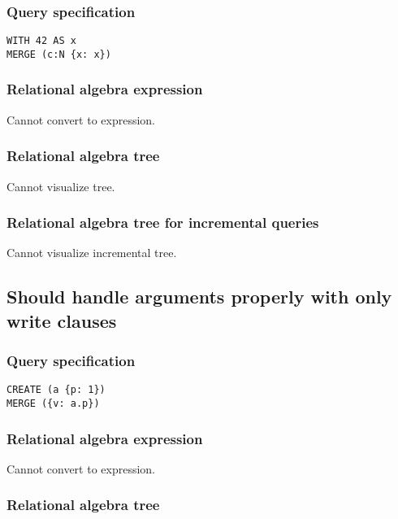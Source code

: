 \subsubsection*{Query specification}

\begin{lstlisting}
WITH 42 AS x
MERGE (c:N {x: x})
\end{lstlisting}

\subsubsection*{Relational algebra expression}

Cannot convert to expression.

\subsubsection*{Relational algebra tree}

Cannot visualize tree.

\subsubsection*{Relational algebra tree for incremental queries}

Cannot visualize incremental tree.

\subsection{Should handle arguments properly with only write clauses}

\subsubsection*{Query specification}

\begin{lstlisting}
CREATE (a {p: 1})
MERGE ({v: a.p})
\end{lstlisting}

\subsubsection*{Relational algebra expression}

Cannot convert to expression.

\subsubsection*{Relational algebra tree}

